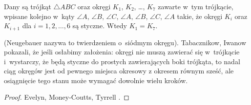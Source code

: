 \begin{proposition}
%
    Dany są trójkąt $\triangle ABC$ oraz okręgi $K_1$, $K_2$, \ldots, $K_7$ zawarte w~tym trójkącie, wpisane kolejno w~kąty $\angle A$, $\angle B$, $\angle C$, $\angle A$, $\angle B$, $\angle C$, $\angle A$ takie, że okręgi $K_i$ oraz $K_{i+1}$ dla $i = 1, 2, \ldots, 6$ są styczne.
    Wtedy $K_1 = K_7$.
\end{proposition}

(Neugebauer \cite[s. 101]{neugebauer_2018} nazywa to twierdzeniem o~siódmym okręgu).
Tabacznikow, Iwanow \cite{ivanov_tabachnikov_2016} pokazali, że jeśli osłabimy założenia: okręgi nie muszą zawierać się w~trójkącie i~wystarczy, że będą styczne do prostych zawierających boki trójkąta, to nadal ciąg okręgów jest od pewnego miejsca okresowy z okresem równym sześć, ale osiągnięcie tego stanu może wymagać dowolnie wielu kroków.
%
%

\begin{proof}
    Evelyn, Money-Coutts, Tyrrell \cite[s. 49–58]{evelyn_money_coutts_tyrrell_1974}.
%
%
%
\end{proof}

%